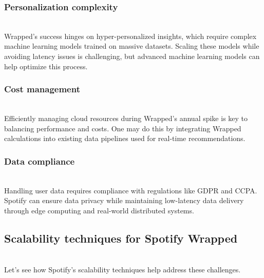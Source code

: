 \subsubsection{Personalization complexity}\label{f4nz6BFrjskG6SUTTqPuQ}
\\
Wrapped's success hinges on hyper-personalized insights, which require complex machine learning models trained on massive datasets. Scaling these models while avoiding latency issues is challenging, but advanced machine learning models can help optimize this process.

\subsubsection{Cost management}\label{VsWA3WS7LrGwa-X6taJ9m}
\\
Efficiently managing cloud resources during Wrapped's annual spike is key to balancing performance and costs. One may do this by integrating Wrapped calculations into existing data pipelines used for real-time recommendations.

\subsubsection{Data compliance}\label{omsNXiL3aMMr3I1crNneq}
\\
Handling user data requires compliance with regulations like GDPR and CCPA. Spotify can ensure data privacy while maintaining low-latency data delivery through edge computing and real-world distributed systems.

\subsection{Scalability techniques for Spotify Wrapped}\label{G_kkumAhU5MmHREk7D8EM}
\\
Let's see how Spotify's scalability techniques help address these challenges.

